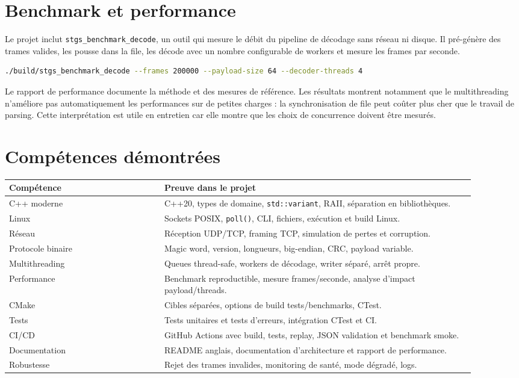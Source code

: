 \documentclass[11pt,a4paper]{article}
\newcommand{\code}[1]{\texttt{#1}}
\begin{document}
\section{Benchmark et performance}

Le projet inclut \code{stgs\_benchmark\_decode}, un outil qui mesure le débit du pipeline de décodage sans réseau ni disque. Il pré-génère des trames valides, les pousse dans la file, les décode avec un nombre configurable de workers et mesure les frames par seconde.

\begin{lstlisting}[language=bash]
./build/stgs_benchmark_decode --frames 200000 --payload-size 64 --decoder-threads 4
\end{lstlisting}

Le rapport de performance documente la méthode et des mesures de référence. Les résultats montrent notamment que le multithreading n'améliore pas automatiquement les performances sur de petites charges : la synchronisation de file peut coûter plus cher que le travail de parsing. Cette interprétation est utile en entretien car elle montre que les choix de concurrence doivent être mesurés.

\section{Compétences démontrées}

\begin{longtable}{p{0.30\linewidth} p{0.60\linewidth}}
\toprule
\textbf{Compétence} & \textbf{Preuve dans le projet} \\
\midrule
C++ moderne & C++20, types de domaine, \code{std::variant}, RAII, séparation en bibliothèques. \\
Linux & Sockets POSIX, \code{poll()}, CLI, fichiers, exécution et build Linux. \\
Réseau & Réception UDP/TCP, framing TCP, simulation de pertes et corruption. \\
Protocole binaire & Magic word, version, longueurs, big-endian, CRC, payload variable. \\
Multithreading & Queues thread-safe, workers de décodage, writer séparé, arrêt propre. \\
Performance & Benchmark reproductible, mesure frames/seconde, analyse d'impact payload/threads. \\
CMake & Cibles séparées, options de build tests/benchmarks, CTest. \\
Tests & Tests unitaires et tests d'erreurs, intégration CTest et CI. \\
CI/CD & GitHub Actions avec build, tests, replay, JSON validation et benchmark smoke. \\
Documentation & README anglais, documentation d'architecture et rapport de performance. \\
Robustesse & Rejet des trames invalides, monitoring de santé, mode dégradé, logs. \\
\bottomrule
\end{longtable}
\end{document}
